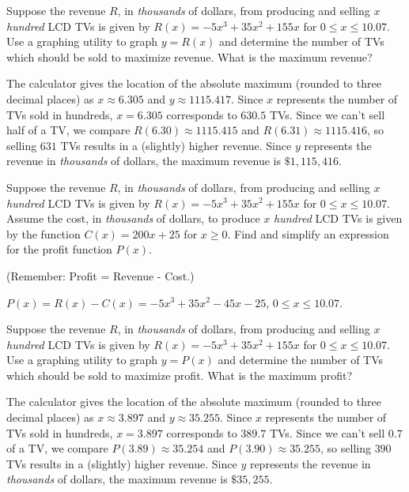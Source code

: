 \documentclass{ximera}
\begin{document}
\begin{problem}\label{lcdmaxprofitexerfirst}
Suppose the revenue $R$, in \textit{thousands} of dollars, from producing and selling $x$ \textit{hundred} LCD TVs is given by $R(x) = -5x^3+35x^2+155x$ for $0 \leq x \leq 10.07$.
Use a graphing utility to graph $y = R(x)$ and determine the number of TVs which should be sold to maximize revenue.  What is the maximum revenue?  

\begin{solution}
    The calculator gives the location  of the absolute maximum (rounded to three decimal places) as $x \approx 6.305$ and $y \approx 1115.417$.  Since $x$ represents the number of TVs sold in hundreds, $x = 6.305$ corresponds to $630.5$ TVs.  Since we can't sell half of a TV, we compare $R(6.30) \approx 1115.415$ and $R(6.31) \approx 1115.416$, so selling $631$ TVs results in a (slightly) higher revenue.  Since $y$ represents the revenue in \textit{thousands} of dollars, the maximum revenue is $\$ 1,\!115,\!416$.
\end{solution}
\end{problem}

\begin{problem}
Suppose the revenue $R$, in \textit{thousands} of dollars, from producing and selling $x$ \textit{hundred} LCD TVs is given by $R(x) = -5x^3+35x^2+155x$ for $0 \leq x \leq 10.07$.
Assume the cost, in \textit{thousands} of dollars, to produce $x$ \textit{hundred} LCD TVs is given by the function $C(x) = 200x + 25$ for $x \geq 0$. Find and simplify an expression for the profit function $P(x)$.  

(Remember: Profit = Revenue - Cost.)

\begin{solution}
    $P(x) = R(x) - C(x) = -5x^3+35x^2-45x-25$, $0 \leq x \leq 10.07$.
\end{solution}
\end{problem}

\begin{problem}\label{lcdmaxprofitexerlast}
Suppose the revenue $R$, in \textit{thousands} of dollars, from producing and selling $x$ \textit{hundred} LCD TVs is given by $R(x) = -5x^3+35x^2+155x$ for $0 \leq x \leq 10.07$.
Use a graphing utility to graph $y = P(x)$ and determine the number of TVs which should be sold to maximize profit.  What is the maximum  profit?

\begin{solution}
    The calculator gives the location  of the absolute maximum (rounded to three decimal places) as $x \approx 3.897$ and $y \approx 35.255$.  Since $x$ represents the number of TVs sold in hundreds, $x = 3.897$ corresponds to $389.7$ TVs.  Since we can't sell $0.7$ of a TV, we compare $P(3.89) \approx 35.254$ and $P(3.90) \approx 35.255$, so selling $390$ TVs results in a (slightly) higher revenue.  Since $y$ represents the revenue in \textit{thousands} of dollars, the maximum revenue is $\$ 35,\!255$.
\end{solution}
\end{problem}
\end{document}
